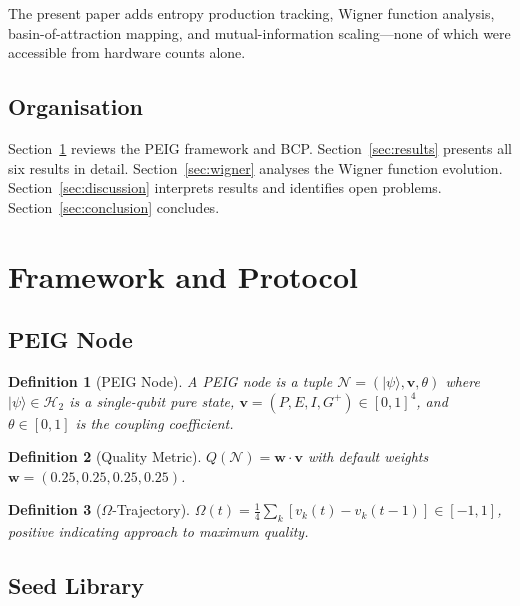 \documentclass[12pt]{article}
\newtheorem{definition}{Definition}
\newcommand{\ket}[1]{|#1\rangle}
\newcommand{\Hil}{\mathcal{H}}
\begin{document}
The present paper adds entropy production tracking, Wigner function analysis,
basin-of-attraction mapping, and mutual-information scaling---none of which
were accessible from hardware counts alone.

\subsection{Organisation}

Section~\ref{sec:framework} reviews the PEIG framework and BCP.
Section~\ref{sec:results} presents all six results in detail.
Section~\ref{sec:wigner} analyses the Wigner function evolution.
Section~\ref{sec:discussion} interprets results and identifies open problems.
Section~\ref{sec:conclusion} concludes.

\section{Framework and Protocol}
\label{sec:framework}

\subsection{PEIG Node}

\begin{definition}[PEIG Node]
A \emph{PEIG node} is a tuple $\mathcal{N} = (\ket{\psi}, \mathbf{v}, \theta)$
where $\ket{\psi} \in \Hil_2$ is a single-qubit pure state,
$\mathbf{v} = (P, E, I, G^+) \in [0,1]^4$, and $\theta \in [0,1]$
is the coupling coefficient.
\end{definition}

\begin{definition}[Quality Metric]
$Q(\mathcal{N}) = \mathbf{w} \cdot \mathbf{v}$ with default weights
$\mathbf{w} = (0.25, 0.25, 0.25, 0.25)$.
\end{definition}

\begin{definition}[$\Omega$-Trajectory]
$\Omega(t) = \frac{1}{4}\sum_k [v_k(t) - v_k(t-1)] \in [-1,1]$,
positive indicating approach to maximum quality.
\end{definition}

\subsection{Seed Library}
\end{document}
